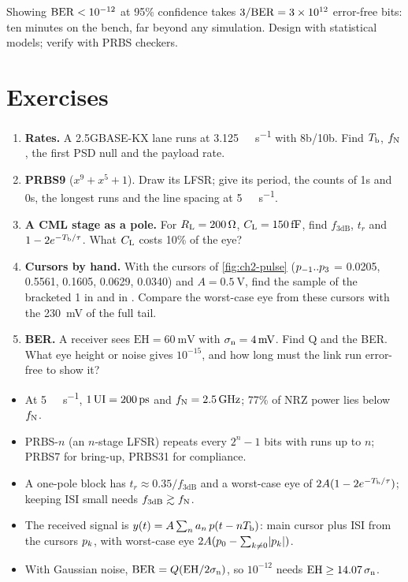 \begin{pitfall}
Showing $\mathrm{BER} < 10^{-12}$ at 95\% confidence takes $3/\mathrm{BER} = 3\times10^{12}$ error-free bits: ten minutes on the bench, far beyond any simulation. Design with statistical models; verify with PRBS checkers.
\end{pitfall}

\section{Exercises}\label{sec:ch2-exercises}
\begin{enumerate}[label=\textbf{2.\arabic*},leftmargin=2.2em]
  \item \textbf{Rates.} A 2.5GBASE-KX lane runs at \qty{3.125}{\giga\bit\per\second} with 8b/10b. Find $T_\mathrm{b}$, $f_\mathrm{N}$, the first PSD null and the payload rate.
  \item \textbf{PRBS9} ($x^9 + x^5 + 1$). Draw its LFSR; give its period, the counts of 1s and 0s, the longest runs and the line spacing at \qty{5}{\giga\bit\per\second}.
  \item \textbf{A CML stage as a pole.} For $R_\mathrm{L} = \qty{200}{\ohm}$, $\CL = \qty{150}{\femto\farad}$, find $f_\mathrm{3dB}$, $t_r$ and $1 - 2e^{-T_\mathrm{b}/\tau}$. What $C_\mathrm{L}$ costs 10\% of the eye?
  \item \textbf{Cursors by hand.} With the cursors of \cref{fig:ch2-pulse} ($p_{-1}..p_{3}$ = 0.0205, 0.5561, 0.1605, 0.0629, 0.0340) and $A = \qty{0.5}{\volt}$, find the sample of the bracketed 1 in  and in . Compare the worst-case eye from these cursors with the \qty{230}{\milli\volt} of the full tail.
  \item \textbf{BER.} A receiver sees $\mathrm{EH} = \qty{60}{\milli\volt}$ with $\sigma_\mathrm{n} = \qty{4}{\milli\volt}$. Find Q and the BER. What eye height or noise gives $10^{-15}$, and how long must the link run error-free to show it?
\end{enumerate}

\begin{takeaways}
\begin{itemize}
  \item At \qty{5}{\giga\bit\per\second}, $1\,\UI = \qty{200}{\pico\second}$ and $f_\mathrm{N} = \qty{2.5}{\giga\hertz}$; 77\% of NRZ power lies below $f_\mathrm{N}$.
  \item PRBS-$n$ (an $n$-stage LFSR) repeats every $2^n - 1$ bits with runs up to $n$; PRBS7 for bring-up, PRBS31 for compliance.
  \item A one-pole block has $t_r \approx 0.35/f_\mathrm{3dB}$ and a worst-case eye of $2A(1 - 2e^{-T_\mathrm{b}/\tau})$; keeping ISI small needs $f_\mathrm{3dB} \gtrsim f_\mathrm{N}$.
  \item The received signal is $y(t) = A\sum_n a_n\,p(t - nT_\mathrm{b})$: main cursor plus ISI from the cursors $p_{k}$, with worst-case eye $2A(p_{0} - \sum_{k\ne0}\lvert p_{k}\rvert)$.
  \item With Gaussian noise, $\mathrm{BER} = Q(\mathrm{EH}/2\sigma_\mathrm{n})$, so $10^{-12}$ needs $\mathrm{EH} \ge 14.07\,\sigma_\mathrm{n}$.
\end{itemize}
\end{takeaways}
